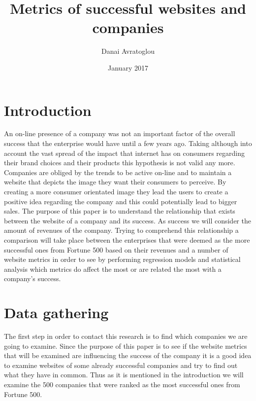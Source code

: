 \documentclass{article}
\begin{document}
\title{Metrics of successful websites and companies}
\author{Danai Avratoglou}
\date{January 2017}
\maketitle
\newpage
\tableofcontents
\newpage
\section{Introduction}
 
An on-line presence of a company was not an important factor of the overall success that the enterprise would have until a few years ago. Taking although into account the vast spread of the impact that internet has on consumers regarding their brand choices and their products this hypothesis is not valid any more. Companies are obliged by the trends to be active on-line and to maintain a website that depicts the image they want their consumers to perceive. By creating a more consumer orientated image they lead the users to create a positive idea regarding the company and this could potentially lead to bigger sales. The purpose of this paper is to understand the relationship that exists between the website of a company and its success. As success we will consider the amount of revenues of the company. Trying to comprehend this relationship a comparison will take place between the enterprises that were deemed as the more successful ones from Fortune 500  based on their revenues and a number of website metrics in order to see by performing regression models and statistical analysis which metrics do affect the most or are related the most with a company's success.
\newpage
\section{Data gathering}
The first step in order to contact this research is to find which companies we are going to examine. Since the purpose of this paper is to see if the website metrics that will be examined are influencing the success of the company it is a good idea to examine websites of some already successful companies and try to find out what they have in common. Thus as it is mentioned in the introduction we will examine the 500 companies that were ranked as the most successful ones from Fortune 500.
\end{document}
